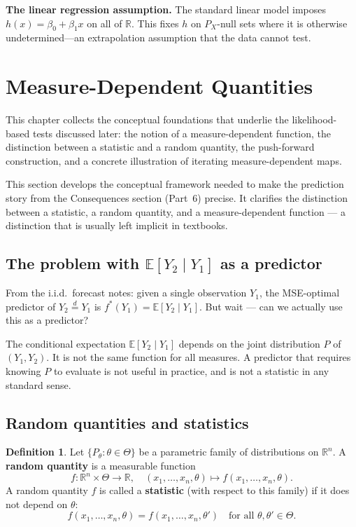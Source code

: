 \documentclass[a4paper,oneside,12pt]{extarticle}
\theoremstyle{plain}
\theoremstyle{definition}
\newtheorem{definition}[proposition]{Definition}
\theoremstyle{remark}
\newcommand*{\E}{\mathbb{E}}
\newcommand*{\mR}{\mathbb{R}}
\begin{document}
\textbf{The linear regression assumption.}
The standard linear model imposes $h(x) = \beta_0 + \beta_1 x$ on all
of $\mR$. This fixes $h$ on $P_X$-null sets where it is otherwise
undetermined---an extrapolation assumption that the data cannot test.

\section{Measure-Dependent Quantities}
\label{sec:measure_dependent}

This chapter collects the conceptual foundations that underlie the
likelihood-based tests discussed later: the notion of a
measure-dependent function, the distinction between a statistic and
a random quantity, the push-forward construction, and a concrete
illustration of iterating measure-dependent maps.


This section develops the conceptual framework needed to make the
prediction story from the Consequences section (Part~6) precise. It
clarifies the distinction between a statistic, a random quantity, and
a measure-dependent function --- a distinction that is usually left
implicit in textbooks.

\subsection{The problem with $\E[Y_2 \mid Y_1]$ as a predictor}

From the i.i.d.\ forecast notes: given a single observation $Y_1$,
the MSE-optimal predictor of $Y_2 \overset{d}{=} Y_1$ is
$f^*(Y_1) = \E[Y_2 \mid Y_1]$. But wait --- can we actually use this
as a predictor?

The conditional expectation $\E[Y_2 \mid Y_1]$ depends on the joint
distribution $P$ of $(Y_1, Y_2)$. It is not the same function for all
measures. A predictor that requires knowing $P$ to evaluate is not
useful in practice, and is not a statistic in any standard sense.

\subsection{Random quantities and statistics}

\begin{definition}
Let $\{P_\theta : \theta \in \Theta\}$ be a parametric family of
distributions on $\mR^n$. A \textbf{random quantity} is a measurable
function
\[
  f: \mR^n \times \Theta \to \mR,
  \quad (x_1,\ldots,x_n,\theta) \mapsto f(x_1,\ldots,x_n,\theta).
\]
A random quantity $f$ is called a \textbf{statistic} (with respect to
this family) if it does not depend on $\theta$:
\[
  f(x_1,\ldots,x_n,\theta) = f(x_1,\ldots,x_n,\theta')
  \quad \text{for all } \theta,\theta' \in \Theta.
\]
\end{definition}
\end{document}

